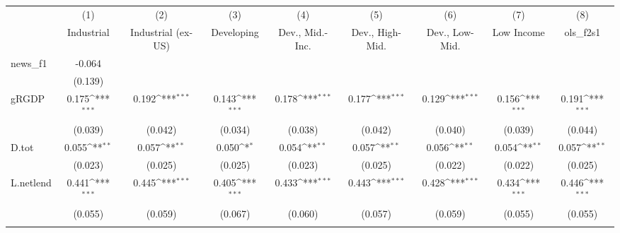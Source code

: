 {
\def\sym#1{\ifmmode^{#1}\else\(^{#1}\)\fi}
\begin{tabular}{l*{8}{c}}
\toprule
            &\multicolumn{1}{c}{(1)}&\multicolumn{1}{c}{(2)}&\multicolumn{1}{c}{(3)}&\multicolumn{1}{c}{(4)}&\multicolumn{1}{c}{(5)}&\multicolumn{1}{c}{(6)}&\multicolumn{1}{c}{(7)}&\multicolumn{1}{c}{(8)}\\
            &\multicolumn{1}{c}{Industrial}&\multicolumn{1}{c}{Industrial (ex-US)}&\multicolumn{1}{c}{Developing}&\multicolumn{1}{c}{Dev., Mid.-Inc.}&\multicolumn{1}{c}{Dev., High-Mid.}&\multicolumn{1}{c}{Dev., Low-Mid.}&\multicolumn{1}{c}{Low Income}&\multicolumn{1}{c}{ols\_f2s1}\\
\midrule
news\_f1     &      -0.064         &                     &                     &                     &                     &                     &                     &                     \\
            &     (0.139)         &                     &                     &                     &                     &                     &                     &                     \\
\addlinespace
gRGDP       &       0.175\sym{***}&       0.192\sym{***}&       0.143\sym{***}&       0.178\sym{***}&       0.177\sym{***}&       0.129\sym{***}&       0.156\sym{***}&       0.191\sym{***}\\
            &     (0.039)         &     (0.042)         &     (0.034)         &     (0.038)         &     (0.042)         &     (0.040)         &     (0.039)         &     (0.044)         \\
\addlinespace
D.tot       &       0.055\sym{**} &       0.057\sym{**} &       0.050\sym{*}  &       0.054\sym{**} &       0.057\sym{**} &       0.056\sym{**} &       0.054\sym{**} &       0.057\sym{**} \\
            &     (0.023)         &     (0.025)         &     (0.025)         &     (0.023)         &     (0.025)         &     (0.022)         &     (0.022)         &     (0.025)         \\
\addlinespace
L.netlend   &       0.441\sym{***}&       0.445\sym{***}&       0.405\sym{***}&       0.433\sym{***}&       0.443\sym{***}&       0.428\sym{***}&       0.434\sym{***}&       0.446\sym{***}\\
            &     (0.055)         &     (0.059)         &     (0.067)         &     (0.060)         &     (0.057)         &     (0.059)         &     (0.055)         &     (0.055)         \\
\addlinespace

\end{tabular}}
